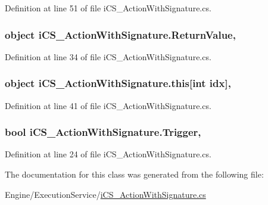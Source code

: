 Definition at line 51 of file i\+C\+S\+\_\+\+Action\+With\+Signature.\+cs.

\hypertarget{classi_c_s___action_with_signature_a8d31da597b92386c24a98cd15c3613c8}{
\subsubsection[{Return\+Value}]{\setlength{\rightskip}{0pt plus 5cm}object i\+C\+S\+\_\+\+Action\+With\+Signature.\+Return\+Value\hspace{0.3cm}{\ttfamily [get]}, {\ttfamily [set]}}}\label{classi_c_s___action_with_signature_a8d31da597b92386c24a98cd15c3613c8}


Definition at line 34 of file i\+C\+S\+\_\+\+Action\+With\+Signature.\+cs.

\hypertarget{classi_c_s___action_with_signature_afe215e8c8ba7125f1a7fba5d5c916362}{
\subsubsection[{this[int idx]}]{\setlength{\rightskip}{0pt plus 5cm}object i\+C\+S\+\_\+\+Action\+With\+Signature.\+this\mbox{[}int idx\mbox{]}\hspace{0.3cm}{\ttfamily [get]}, {\ttfamily [set]}}}\label{classi_c_s___action_with_signature_afe215e8c8ba7125f1a7fba5d5c916362}


Definition at line 41 of file i\+C\+S\+\_\+\+Action\+With\+Signature.\+cs.

\hypertarget{classi_c_s___action_with_signature_a47ac3a636fbae29756df4363b3c17921}{
\subsubsection[{Trigger}]{\setlength{\rightskip}{0pt plus 5cm}bool i\+C\+S\+\_\+\+Action\+With\+Signature.\+Trigger\hspace{0.3cm}{\ttfamily [get]}, {\ttfamily [set]}}}\label{classi_c_s___action_with_signature_a47ac3a636fbae29756df4363b3c17921}


Definition at line 24 of file i\+C\+S\+\_\+\+Action\+With\+Signature.\+cs.



The documentation for this class was generated from the following file\+:\begin{DoxyCompactItemize}
\item 
Engine/\+Execution\+Service/\hyperlink{i_c_s___action_with_signature_8cs}{i\+C\+S\+\_\+\+Action\+With\+Signature.\+cs}\end{DoxyCompactItemize}
